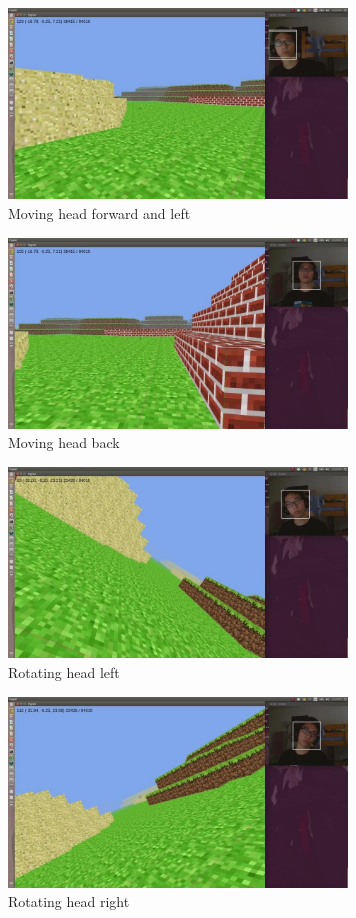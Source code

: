 \documentclass[10pt,twocolumn,letterpaper]{article}
\begin{document}
\begin{figure}[ht!]
\centering
\includegraphics[width=90mm]{forward.jpg}
\caption{Moving head forward and left \label{overflow}}
\end{figure}

\begin{figure}[ht!]
\centering
\includegraphics[width=90mm]{back_away.jpg}
\caption{Moving head back\label{overflow}}
\end{figure}

\begin{figure}[ht!]
\centering
\includegraphics[width=90mm]{rotation_left.jpg}
\caption{Rotating head left \label{overflow}}
\end{figure}

\begin{figure}[ht!]
\centering
\includegraphics[width=90mm]{rotation_right.jpg}
\caption{Rotating head right \label{overflow}}
\end{figure}
\end{document}
